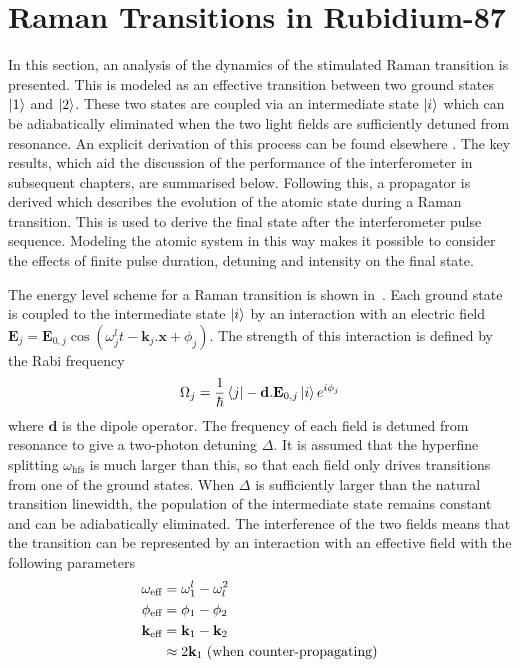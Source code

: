 \section{Raman Transitions in Rubidium-87}\label{sec:theory_raman}
In this section, an analysis of the dynamics of the stimulated Raman transition is
presented. This is modeled as an effective transition between two
ground states $\ket{1}$ and $\ket{2}$. These two states are coupled
via an intermediate state $\ket{i}$ which can be adiabatically
eliminated when the two light fields are sufficiently detuned from
resonance. An explicit derivation of this process can be found
elsewhere
\cite{Moler1992,Weiss1994}. The key results, which aid the discussion
of the performance of the interferometer in subsequent chapters, are
summarised below. Following this, a propagator is derived which
describes the evolution of the atomic state during a Raman transition.
This is used to derive the final state after the interferometer pulse
sequence. Modeling the atomic system in this way makes it possible to consider
the effects of finite pulse duration, detuning and intensity
on the final state. 
\par\noindent
The energy level scheme for a Raman transition is shown
in~. Each ground state is coupled to the
intermediate state $\ket{i}$ by an interaction with an electric field  
$ \textbf{E}_j=
\textbf{E}_{0,j} \cos(\omega_j^l t - \textbf{k}_j.\textbf{x}+
\phi_j)$. The strength of this interaction is defined by the Rabi
frequency\begin{equation}
  \label{eq:rabi_freq}
  \Omega_j = \frac{1}{\hbar}\bra{j} -\textbf{d}.\textbf{E}_{0,j}
  \ket{i} e^{i \phi_j}
\end{equation}
where $\textbf{d}$ is the dipole operator. The frequency of each field is detuned from resonance to
give a two-photon detuning $\Delta$. It is assumed that the
hyperfine splitting $\omega_\text{hfs}$ is much larger than this, so
that each field only drives transitions from one of the ground states. 
When $\Delta$ is sufficiently larger than the natural transition
linewidth, the population of the intermediate state remains constant
and can be adiabatically eliminated. The
interference of the two fields means that the transition can be
represented by an interaction with an effective field with the
following parameters
\begin{subequations}
  \begin{align}
    \omega_\textnormal{eff} &= \omega^l_1 - \omega^2_l \\
    \phi_\textnormal{eff} &= \phi_1 -\phi_2 \\
    {\textbf k_\textnormal{eff}} &= \textbf{k}_1 - \textbf{k}_2 \\
          &\approx 2\textbf{k}_1\;
    \text{(when counter-propagating)} \nonumber 
  \end{align}
\end{subequations}
